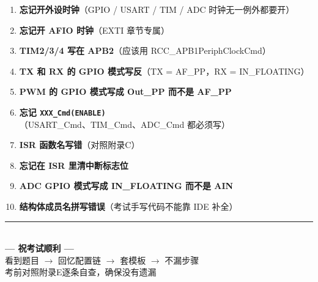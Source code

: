 \documentclass[10pt,a4paper,oneside]{ctexart}
\newcommand{\danger}[1]{\textcolor{accent}{\textbf{#1}}}
\begin{document}
\begin{warnbox}
    \begin{enumerate}[label=\textbf{\textcolor{accent}{\#\arabic*}}, leftmargin=*]
        \item \danger{忘记开外设时钟}（GPIO / USART / TIM / ADC 时钟无一例外都要开）
        \item \danger{忘记开 AFIO 时钟}（EXTI 章节专属）
        \item \danger{TIM2/3/4 写在 APB2}（应该用 RCC\_APB1PeriphClockCmd）
        \item \danger{TX 和 RX 的 GPIO 模式写反}（TX = AF\_PP，RX = IN\_FLOATING）
        \item \danger{PWM 的 GPIO 模式写成 Out\_PP 而不是 AF\_PP}
        \item \danger{忘记 \texttt{XXX\_Cmd(ENABLE)}}（USART\_Cmd、TIM\_Cmd、ADC\_Cmd 都必须写）
        \item \danger{ISR 函数名写错}（对照附录C）
        \item \danger{忘记在 ISR 里清中断标志位}
        \item \danger{ADC GPIO 模式写成 IN\_FLOATING 而不是 AIN}
        \item \danger{结构体成员名拼写错误}（考试手写代码不能靠 IDE 补全）
    \end{enumerate}
\end{warnbox}

\vspace{1cm}
\begin{center}
    \rule{0.5\textwidth}{0.5pt}\\[4mm]
    {\large\bfseries\color{mainblue} --- 祝考试顺利 ---}\\[2mm]
    {\small 看到题目 $\rightarrow$ 回忆配置链 $\rightarrow$ 套模板 $\rightarrow$ 不漏步骤}\\[2mm]
    {\small 考前对照附录E逐条自查，确保没有遗漏}
\end{center}
\end{document}
